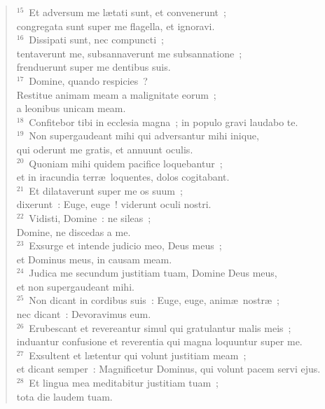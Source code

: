 \begin{verse}
${}^{15}$~Et adversum me l\ae tati sunt, et convenerunt~;\\ congregata sunt super me flagella, et ignoravi.\\
${}^{16}$~Dissipati sunt, nec compuncti~;\\ tentaverunt me, subsannaverunt me subsannatione~;\\ frenduerunt super me dentibus suis.\\
${}^{17}$~Domine, quando respicies~?\\ Restitue animam meam a malignitate eorum~;\\ a leonibus unicam meam.\\
${}^{18}$~Confitebor tibi in ecclesia magna~; in populo gravi laudabo te.\\
${}^{19}$~Non supergaudeant mihi qui adversantur mihi inique,\\ qui oderunt me gratis, et annuunt oculis.\\
${}^{20}$~Quoniam mihi quidem pacifice loquebantur~;\\ et in iracundia terr\ae\ loquentes, dolos cogitabant.\\
${}^{21}$~Et dilataverunt super me os suum~;\\ dixerunt~: Euge, euge~! viderunt oculi nostri.\\
${}^{22}$~Vidisti, Domine~: ne sileas~;\\ Domine, ne discedas a me.\\
${}^{23}$~Exsurge et intende judicio meo, Deus meus~;\\ et Dominus meus, in causam meam.\\
${}^{24}$~Judica me secundum justitiam tuam, Domine Deus meus,\\ et non supergaudeant mihi.\\
${}^{25}$~Non dicant in cordibus suis~: Euge, euge, anim\ae\ nostr\ae~;\\ nec dicant~: Devoravimus eum.\\
${}^{26}$~Erubescant et revereantur simul qui gratulantur malis meis~;\\ induantur confusione et reverentia qui magna loquuntur super me.\\
${}^{27}$~Exsultent et l\ae tentur qui volunt justitiam meam~;\\ et dicant semper~: Magnificetur Dominus, qui volunt pacem servi ejus.\\
${}^{28}$~Et lingua mea meditabitur justitiam tuam~;\\ tota die laudem tuam.\end{verse}



